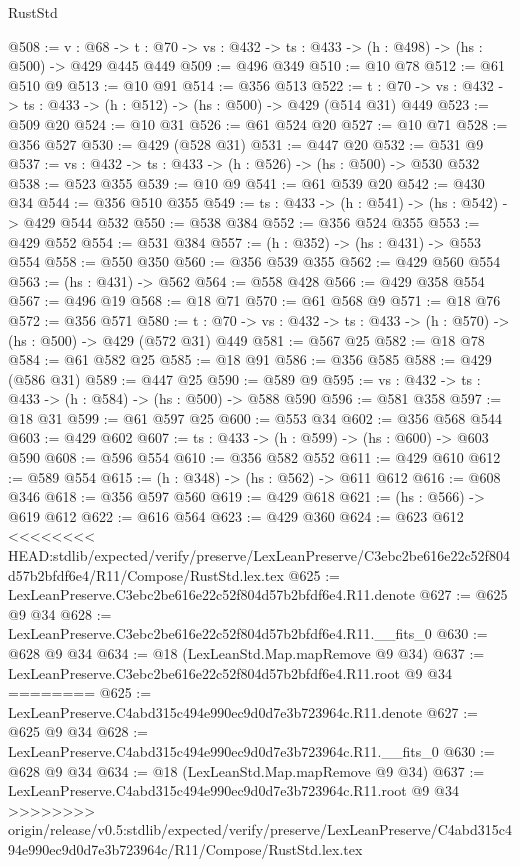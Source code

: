 \begin{lexlean}{RustStd}
\begin{coremodule}
{\begin{coremodule}
@508 := {v : @68} ->
  {t : @70} -> {vs : @432} -> {ts : @433} -> (h : @498) -> (hs : @500) -> @429 @445 @449
@509 := @496 @349
@510 := @10 @78
@512 := @61 @510 @9
@513 := @10 @91
@514 := @356 @513
@522 := {t : @70} -> {vs : @432} -> {ts : @433} -> (h : @512) -> (hs : @500) -> @429 (@514 @31) @449
@523 := @509 @20
@524 := @10 @31
@526 := @61 @524 @20
@527 := @10 @71
@528 := @356 @527
@530 := @429 (@528 @31)
@531 := @447 @20
@532 := @531 @9
@537 := {vs : @432} -> {ts : @433} -> (h : @526) -> (hs : @500) -> @530 @532
@538 := @523 @355
@539 := @10 @9
@541 := @61 @539 @20
@542 := @430 @34
@544 := @356 @510 @355
@549 := {ts : @433} -> (h : @541) -> (hs : @542) -> @429 @544 @532
@550 := @538 @384
@552 := @356 @524 @355
@553 := @429 @552
@554 := @531 @384
@557 := (h : @352) -> (hs : @431) -> @553 @554
@558 := @550 @350
@560 := @356 @539 @355
@562 := @429 @560 @554
@563 := (hs : @431) -> @562
@564 := @558 @428
@566 := @429 @358 @554
@567 := @496 @19
@568 := @18 @71
@570 := @61 @568 @9
@571 := @18 @76
@572 := @356 @571
@580 := {t : @70} -> {vs : @432} -> {ts : @433} -> (h : @570) -> (hs : @500) -> @429 (@572 @31) @449
@581 := @567 @25
@582 := @18 @78
@584 := @61 @582 @25
@585 := @18 @91
@586 := @356 @585
@588 := @429 (@586 @31)
@589 := @447 @25
@590 := @589 @9
@595 := {vs : @432} -> {ts : @433} -> (h : @584) -> (hs : @500) -> @588 @590
@596 := @581 @358
@597 := @18 @31
@599 := @61 @597 @25
@600 := @553 @34
@602 := @356 @568 @544
@603 := @429 @602
@607 := {ts : @433} -> (h : @599) -> (hs : @600) -> @603 @590
@608 := @596 @554
@610 := @356 @582 @552
@611 := @429 @610
@612 := @589 @554
@615 := (h : @348) -> (hs : @562) -> @611 @612
@616 := @608 @346
@618 := @356 @597 @560
@619 := @429 @618
@621 := (hs : @566) -> @619 @612
@622 := @616 @564
@623 := @429 @360
@624 := @623 @612
<<<<<<<< HEAD:stdlib/expected/verify/preserve/LexLeanPreserve/C3ebc2be616e22c52f804d57b2bfdf6e4/R11/Compose/RustStd.lex.tex
@625 := LexLeanPreserve.C3ebc2be616e22c52f804d57b2bfdf6e4.R11.denote
@627 := @625 @9 @34
@628 := LexLeanPreserve.C3ebc2be616e22c52f804d57b2bfdf6e4.R11.__fits_0
@630 := @628 @9 @34
@634 := @18 (LexLeanStd.Map.mapRemove @9 @34)
@637 := LexLeanPreserve.C3ebc2be616e22c52f804d57b2bfdf6e4.R11.root @9 @34
========
@625 := LexLeanPreserve.C4abd315c494e990ec9d0d7e3b723964c.R11.denote
@627 := @625 @9 @34
@628 := LexLeanPreserve.C4abd315c494e990ec9d0d7e3b723964c.R11.__fits_0
@630 := @628 @9 @34
@634 := @18 (LexLeanStd.Map.mapRemove @9 @34)
@637 := LexLeanPreserve.C4abd315c494e990ec9d0d7e3b723964c.R11.root @9 @34
>>>>>>>> origin/release/v0.5:stdlib/expected/verify/preserve/LexLeanPreserve/C4abd315c494e990ec9d0d7e3b723964c/R11/Compose/RustStd.lex.tex

\end{coremodule}}
\end{coremodule}
\end{lexlean}
